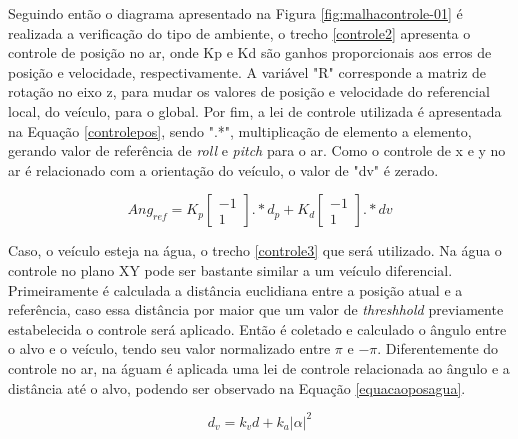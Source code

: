 \pagebreak

Seguindo então o diagrama apresentado na Figura \ref{fig:malhacontrole-01} é realizada a verificação do tipo de ambiente, o trecho \ref{controle2} apresenta o controle de posição no ar, onde Kp e Kd são ganhos proporcionais aos erros de posição e velocidade, respectivamente. A variável "R" corresponde a matriz de rotação no eixo z, para mudar os valores de posição e velocidade do referencial local, do veículo, para o global. Por fim, a lei de controle utilizada é apresentada na Equação \ref{controlepos}, sendo ".*", multiplicação de elemento a elemento, gerando valor de referência de \textit{roll} e \textit{pitch} para o ar. Como o controle de x e y no ar é relacionado com a orientação do veículo, o valor de "dv" é zerado.



\begin{equation}
    \label{controlepos}
    Ang_{ref} =  K_p\begin{bmatrix}
    -1\\
    1
    \end{bmatrix}.*d_p + K_d\begin{bmatrix}
    -1\\
    1
    \end{bmatrix}.*dv
\end{equation}

Caso, o veículo esteja na água, o trecho \ref{controle3} que será utilizado. Na água o controle no plano XY pode ser bastante similar a um veículo diferencial. Primeiramente é calculada a distância euclidiana entre a posição atual e a referência, caso essa distância por maior que um valor de \textit{threshhold} previamente estabelecida o controle será aplicado. Então é coletado e calculado o ângulo entre o alvo e o veículo, tendo seu valor normalizado entre $\pi$ e $-\pi$. Diferentemente do controle no ar, na águam é aplicada uma lei de controle relacionada ao ângulo e a distância até o alvo, podendo ser observado na Equação \ref{equacaoposagua}.



\begin{equation}
    \label{equacaoposagua}
    d_v = k_vd + k_a|\alpha|^2
\end{equation}

